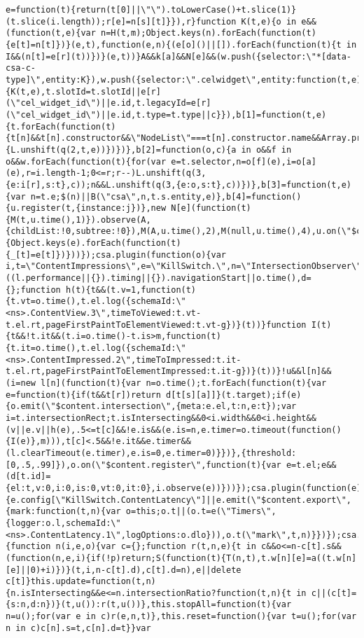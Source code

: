 \documentclass[
]{article}
\begin{document}
\begin{verbatim}
e=function(t){return(t[0]||\"\").toLowerCase()+t.slice(1)}(t.slice(i.length));r[e]=n[s][t]}}),r}function K(t,e){o in e&&(function(t,e){var n=H(t,m);Object.keys(n).forEach(function(t){e[t]=n[t]})}(e,t),function(e,n){(e[o]()||[]).forEach(function(t){t in I&&(n[t]=e[r](t))})}(e,t))}A&&k[a]&&N[e]&&(w.push({selector:\"*[data-csa-c-type]\",entity:K}),w.push({selector:\".celwidget\",entity:function(t,e){K(t,e),t.slotId=t.slotId||e[r](\"cel_widget_id\")||e.id,t.legacyId=e[r](\"cel_widget_id\")||e.id,t.type=t.type||c}}),b[1]=function(t,e){t.forEach(function(t){t[n]&&t[n].constructor&&\"NodeList\"===t[n].constructor.name&&Array.prototype.forEach.call(t[n],function(t){L.unshift(q(2,t,e))})})},b[2]=function(o,c){a in o&&f in o&&w.forEach(function(t){for(var e=t.selector,n=o[f](e),i=o[a](e),r=i.length-1;0<=r;r--)L.unshift(q(3,{e:i[r],s:t},c));n&&L.unshift(q(3,{e:o,s:t},c))})},b[3]=function(t,e){var n=t.e;$(n)||B(\"csa\",n,t.s.entity,e)},b[4]=function(){u.register(t,{instance:j})},new N[e](function(t){M(t,u.time(),1)}).observe(A,{childList:!0,subtree:!0}),M(A,u.time(),2),M(null,u.time(),4),u.on(\"$content.export\",function(e){Object.keys(e).forEach(function(t){_[t]=e[t]})}))});csa.plugin(function(o){var i,t=\"ContentImpressions\",e=\"KillSwitch.\",n=\"IntersectionObserver\",r=\"getAttribute\",s=\"dataset\",c=\"intersectionRatio\",a=\"csaCId\",m=1e3,l=o.global,f=o.config,u=f[e+t],v=f[e+t+\".ContentViews\"],g=((l.performance||{}).timing||{}).navigationStart||o.time(),d={};function h(t){t&&(t.v=1,function(t){t.vt=o.time(),t.el.log({schemaId:\"<ns>.ContentView.3\",timeToViewed:t.vt-t.el.rt,pageFirstPaintToElementViewed:t.vt-g})}(t))}function I(t){t&&!t.it&&(t.i=o.time()-t.is>m,function(t){t.it=o.time(),t.el.log({schemaId:\"<ns>.ContentImpressed.2\",timeToImpressed:t.it-t.el.rt,pageFirstPaintToElementImpressed:t.it-g})}(t))}!u&&l[n]&&(i=new l[n](function(t){var n=o.time();t.forEach(function(t){var e=function(t){if(t&&t[r])return d[t[s][a]]}(t.target);if(e){o.emit(\"$content.intersection\",{meta:e.el,t:n,e:t});var i=t.intersectionRect;t.isIntersecting&&0<i.width&&0<i.height&&(v||e.v||h(e),.5<=t[c]&&!e.is&&(e.is=n,e.timer=o.timeout(function(){I(e)},m))),t[c]<.5&&!e.it&&e.timer&&(l.clearTimeout(e.timer),e.is=0,e.timer=0)}})},{threshold:[0,.5,.99]}),o.on(\"$content.register\",function(t){var e=t.el;e&&(d[t.id]={el:t,v:0,i:0,is:0,vt:0,it:0},i.observe(e))}))});csa.plugin(function(e){e.config[\"KillSwitch.ContentLatency\"]||e.emit(\"$content.export\",{mark:function(t,n){var o=this;o.t||(o.t=e(\"Timers\",{logger:o.l,schemaId:\"<ns>.ContentLatency.1\",logOptions:o.dlo})),o.t(\"mark\",t,n)}})});csa.plugin(function(t){function n(i,e,o){var c={};function r(t,n,e){t in c&&o<=n-c[t].s&&(function(n,e,i){if(!p)return;S(function(t){T(n,t),t.w[n][e]=a((t.w[n][e]||0)+i)})}(t,i,n-c[t].d),c[t].d=n),e||delete c[t]}this.update=function(t,n){n.isIntersecting&&e<=n.intersectionRatio?function(t,n){t in c||(c[t]={s:n,d:n})}(t,u()):r(t,u())},this.stopAll=function(t){var n=u();for(var e in c)r(e,n,t)},this.reset=function(){var t=u();for(var n in c)c[n].s=t,c[n].d=t}}var 
\end{verbatim}
\end{document}
